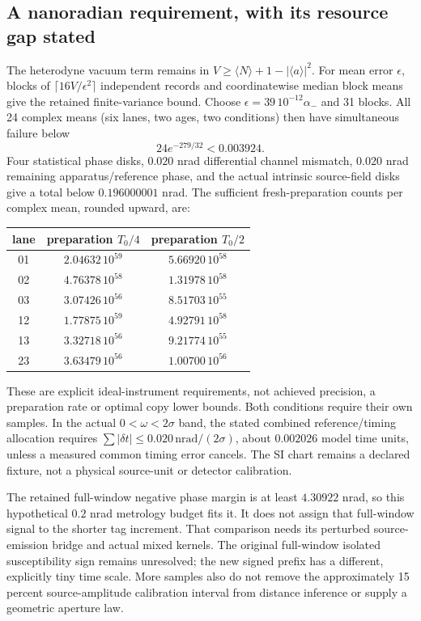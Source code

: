 \subsection{A nanoradian requirement, with its resource gap stated}
The heterodyne vacuum term remains in
$V\geq\langle N\rangle+1-|\langle a\rangle|^2$.  For mean error
$\epsilon$, blocks of $\lceil16V/\epsilon^2\rceil$ independent records and
coordinatewise median block means give the retained finite-variance bound.
Choose $\epsilon=39\,10^{-12}\alpha_-$ and 31 blocks.  All 24 complex means
(six lanes, two ages, two conditions) then have simultaneous failure below
\[
 24e^{-279/32}<0.003924.
\]
Four statistical phase disks, $0.020$ nrad differential channel mismatch,
$0.020$ nrad remaining apparatus/reference phase, and the actual intrinsic
source-field disks give a total below $0.196000001$ nrad.  The sufficient
fresh-preparation counts per complex mean, rounded upward, are:
\begin{center}\begin{tabular}{c|c|c}
 lane&preparation $T_0/4$&preparation $T_0/2$\\\hline
 01&$2.04632\,10^{59}$&$5.66920\,10^{58}$\\
 02&$4.76378\,10^{58}$&$1.31978\,10^{58}$\\
 03&$3.07426\,10^{56}$&$8.51703\,10^{55}$\\
 12&$1.77875\,10^{59}$&$4.92791\,10^{58}$\\
 13&$3.32718\,10^{56}$&$9.21774\,10^{55}$\\
 23&$3.63479\,10^{56}$&$1.00700\,10^{56}$
\end{tabular}\end{center}
These are explicit ideal-instrument requirements, not achieved precision,
a preparation rate or optimal copy lower bounds.  Both conditions require
their own samples.  In the actual $0<\omega<2\sigma$ band, the stated
combined reference/timing allocation requires
$\sum|\delta t|\leq0.020\,\mathrm{nrad}/(2\sigma)$, about $0.002026$ model
time units, unless a measured common timing error cancels.  The SI chart
remains a declared fixture, not a physical source-unit or detector
calibration.

The retained full-window negative phase margin is at least $4.30922$ nrad,
so this hypothetical $0.2$ nrad metrology budget fits it.  It does not assign
that full-window signal to the shorter tag increment.  That comparison
needs its perturbed source-emission bridge and actual mixed kernels.
The original full-window isolated susceptibility sign remains unresolved; the new signed prefix has a different, explicitly tiny time scale.  More samples
also do not remove the approximately 15 percent source-amplitude calibration
interval from distance inference or supply a geometric aperture law.

